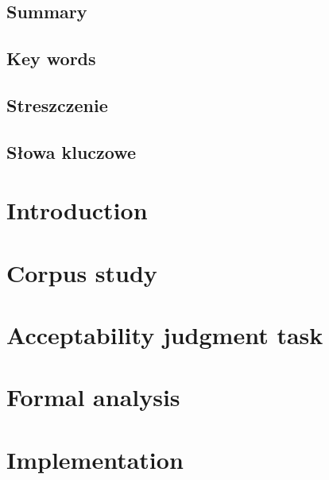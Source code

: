 \documentclass[12pt]{report}
\begin{document}
	
	
	
	\pagestyle{empty}
	\section*{Summary}
	
	\section*{Key words}
	
	\newpage
	\pagestyle{empty}
	\section*{Streszczenie}
	
	\section*{Słowa kluczowe}
	
	
	
	\tableofcontents
	
	
	\pagestyle{fancy}
	\chapter{Introduction} \label{ch:introduction}
	
	
	\chapter{Corpus study} \label{ch:corpus_study}
	
	
	\chapter{Acceptability judgment task} \label{ch:acc_experiment}
	
	
	\chapter{Formal analysis} \label{ch:formal_analysis}
	
	
	
	\chapter{Implementation} \label{ch:implementation}
	
\end{document}
